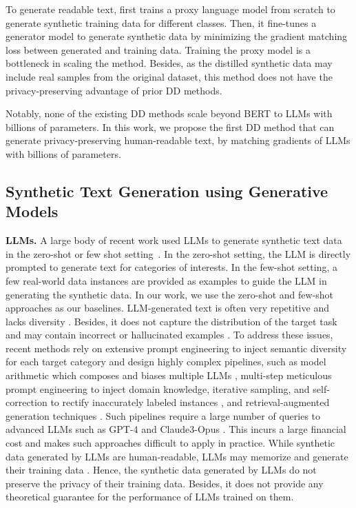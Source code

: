 To generate readable text, \citet{maekawa2024dilm} 
%
first trains a proxy language model from scratch to generate synthetic training %
data for different classes. Then, 
%
it fine-tunes a generator model to generate %
synthetic data by minimizing the gradient matching loss between generated and training data.
%
%
Training the proxy model is a bottleneck in scaling the method. 
%
Besides, as the distilled synthetic data may include real samples from the original dataset, %
%
this method does not have the privacy-preserving advantage of prior DD methods.

Notably, none of the existing DD methods scale beyond BERT \cite{devlin2018bert} to LLMs with billions of parameters.
In this work, we propose the first DD method that can generate privacy-preserving human-readable text, by matching gradients of LLMs with billions of parameters. 



\subsection{Synthetic Text Generation using Generative Models}

\textbf{LLMs.} A large body of recent work used LLMs to generate synthetic text data in the
zero-shot or few shot setting~\cite{meng2022generating,li2023synthetic}. In the zero-shot setting, the LLM is directly prompted to generate text for categories of interests. In the few-shot setting, a few real-world data instances are provided as examples to guide the LLM in generating the synthetic data. 
In our work, we use the zero-shot and few-shot approaches as our baselines.
%
LLM-generated text is often very repetitive and lacks diversity \cite{holtzman2019curious,keskar2019ctrl}. Besides, it does not capture the distribution of the target task and may contain incorrect or hallucinated examples  \cite{ye2022zerogen,meng2022generating,gupta2023targen,li2023synthetic,wu2023bloomberggpt}. 
To address these issues, recent methods rely on extensive prompt engineering to inject semantic diversity for each target category \cite{gupta2023targen} and design highly complex pipelines, such as model arithmetic which composes and biases multiple LLMs \cite{dekoninckcontrolled}, multi-step meticulous prompt engineering to inject domain knowledge, iterative sampling, and self-correction to rectify inaccurately labeled instances \cite{gupta2023targen}, and retrieval-augmented generation techniques \cite{wu2023bloomberggpt}. 
Such pipelines require a large number of queries to advanced LLMs such as GPT-4 \cite{gpt4} and Claude3-Opus \cite{claude3}. %
This incurs a large financial cost and makes such approaches difficult %
to apply in practice.
%
While synthetic data generated by LLMs are human-readable, LLMs may memorize and generate their training data \cite{hartmann2023sok}. Hence, the synthetic data generated by LLMs do not preserve the privacy of their training data. Besides, it does not provide any theoretical guarantee for the performance of LLMs trained on them. 


